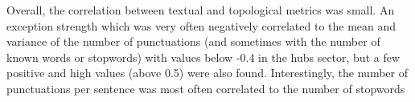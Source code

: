 																																																																																																																																																																																																																																																																																																																																																																																																				
																																																																																																																																																																																																																																																																																																																																																																																																				Overall, the correlation between textual and topological metrics was small. 
																																																																																																																																																																																																																																																																																																																																																																																																				An exception strength which was very often negatively correlated to the mean and variance of the number
																																																																																																																																																																																																																																																																																																																																																																																																				of punctuations (and sometimes with the number of known words or stopwords) with values below -0.4 in the hubs sector, but a few positive and high values (above 0.5) were also found.
																																																																																																																																																																																																																																																																																																																																																																																																				Interestingly, the number of punctuations per sentence was most often correlated to the number of stopwords
